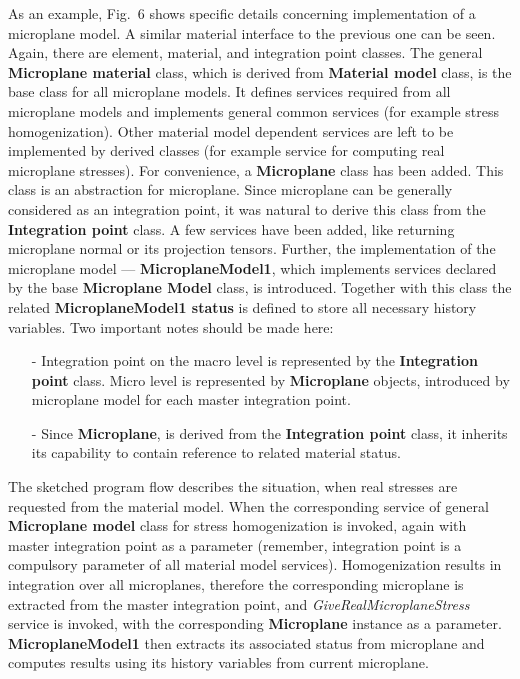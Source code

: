 \documentclass[a4paper]{article}
\newcommand{\class}[1]{{\bf #1}}
\newcommand{\service}[1]{{\em #1}}
\begin{document}
As an example, Fig.~6 shows specific details
concerning implementation of a microplane model. A similar material
interface to the previous one can be seen. Again, there are element,
material, and integration point classes. 
The general \class{Microplane material} class, which is derived from
\class{Material model} class, is the base class for all microplane models.
It defines services required from all microplane models and
implements general common services (for example stress
homogenization). Other material model dependent services are left to
be implemented by derived classes (for example service for computing real microplane stresses). 
For convenience, a \class{Microplane} class has been added.  This class is an
abstraction for microplane. Since microplane can be generally
considered as an integration point, it was natural to derive this class
from the \class{Integration point} class. 
A few services have been added, like returning microplane normal or its projection tensors. 
Further, the implementation of the microplane model ---
\class{MicroplaneModel1}, which implements services declared by the
base \class{Microplane Model} class, is introduced. Together with this
class the related \class{MicroplaneModel1 status} is defined to store
all necessary history variables. 
Two important notes should be made here:
\begin{itemize}
\item[-]
Integration point on the macro level is represented by the \class{Integration
point} class. Micro level is represented by \class{Microplane} objects,
introduced by microplane model for each master integration point. 
\item[-]
Since \class{Microplane}, is derived from the \class{Integration
point} class, it inherits its capability to contain reference to related material status.
\end{itemize}

The sketched program flow describes the situation, when real stresses are requested
from the material model. When the corresponding service of general
\class{Microplane model} class for stress homogenization is invoked, again
with master integration point as a parameter (remember, integration
point is a compulsory parameter of all material model services).
Homogenization results in integration over all microplanes, therefore
the corresponding microplane is extracted from the master integration point,
and \service{GiveRealMicroplaneStress} service is invoked, with
the corresponding \class{Microplane} instance as a
parameter. \class{MicroplaneModel1} then extracts  its associated
status from microplane and computes results using its history variables from current microplane.
\end{document}
